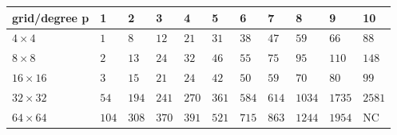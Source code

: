\begin{tabular}{lllllllllll}
\hline
 grid/degree p   & 1     & 2     & 3     & 4     & 5     & 6     & 7     & 8      & 9      & 10     \\
\hline
 $4 \times 4$    & $1$   & $8$   & $12$  & $21$  & $31$  & $38$  & $47$  & $59$   & $66$   & $88$   \\
 $8 \times 8$    & $2$   & $13$  & $24$  & $32$  & $46$  & $55$  & $75$  & $95$   & $110$  & $148$  \\
 $16 \times 16$  & $3$   & $15$  & $21$  & $24$  & $42$  & $50$  & $59$  & $70$   & $80$   & $99$   \\
 $32 \times 32$  & $54$  & $194$ & $241$ & $270$ & $361$ & $584$ & $614$ & $1034$ & $1735$ & $2581$ \\
 $64 \times 64$  & $104$ & $308$ & $370$ & $391$ & $521$ & $715$ & $863$ & $1244$ & $1954$ & NC     \\
\hline
\end{tabular}